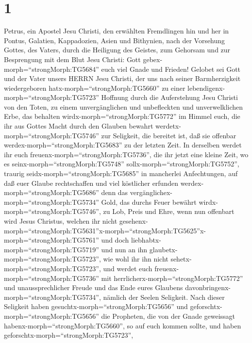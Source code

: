 \hypertarget{section}{%
\section{1}\label{section}}

 Petrus, ein Apostel Jesu Christi, den erwählten Fremdlingen
hin und her in Pontus, Galatien, Kappadozien, Asien und Bithynien,
 nach der Vorsehung Gottes, des Vaters, durch die Heiligung
des Geistes, zum Gehorsam und zur Besprengung mit dem Blut Jesu Christi:
Gott gebex-morph=``strongMorph:TG5684'' euch viel Gnade und Frieden!
 Gelobet sei Gott und der Vater unsers HERRN Jesu Christi,
der uns nach seiner Barmherzigkeit wiedergeboren
hatx-morph=``strongMorph:TG5660'' zu einer
lebendigenx-morph=``strongMorph:TG5723'' Hoffnung durch die Auferstehung
Jesu Christi von den Toten,  zu einem unvergänglichen und
unbefleckten und unverwelklichen Erbe, das behalten
wirdx-morph=``strongMorph:TG5772'' im Himmel  euch, die ihr
aus Gottes Macht durch den Glauben bewahrt
werdetx-morph=``strongMorph:TG5746'' zur Seligkeit, die bereitet ist,
daß sie offenbar werdex-morph=``strongMorph:TG5683'' zu der letzten
Zeit.  In derselben werdet ihr euch
freuenx-morph=``strongMorph:TG5736'', die ihr jetzt eine kleine Zeit, wo
es seinx-morph=``strongMorph:TG5748''
sollx-morph=``strongMorph:TG5752'', traurig
seidx-morph=``strongMorph:TG5685'' in mancherlei Anfechtungen,
 auf daß euer Glaube rechtschaffen und viel köstlicher
erfunden werdex-morph=``strongMorph:TG5686'' denn das
vergänglichex-morph=``strongMorph:TG5734'' Gold, das durchs Feuer
bewährt wirdx-morph=``strongMorph:TG5746'', zu Lob, Preis und Ehre, wenn
nun offenbart wird Jesus Christus,  welchen ihr nicht
gesehenx-morph=``strongMorph:TG5631''\textbar x-morph=``strongMorph:TG5625''x-morph=``strongMorph:TG5761''
und doch liebhabtx-morph=``strongMorph:TG5719'' und nun an ihn
glaubetx-morph=``strongMorph:TG5723'', wie wohl ihr ihn nicht
sehetx-morph=``strongMorph:TG5723'', und werdet euch
freuenx-morph=``strongMorph:TG5736'' mit
herrlicherx-morph=``strongMorph:TG5772'' und unaussprechlicher Freude
 und das Ende eures Glaubens
davonbringenx-morph=``strongMorph:TG5734'', nämlich der Seelen
Seligkeit.  Nach dieser Seligkeit haben
gesuchtx-morph=``strongMorph:TG5656'' und
geforschtx-morph=``strongMorph:TG5656'' die Propheten, die von der Gnade
geweissagt habenx-morph=``strongMorph:TG5660'', so auf euch kommen
sollte,  und haben geforschtx-morph=``strongMorph:TG5723'',
